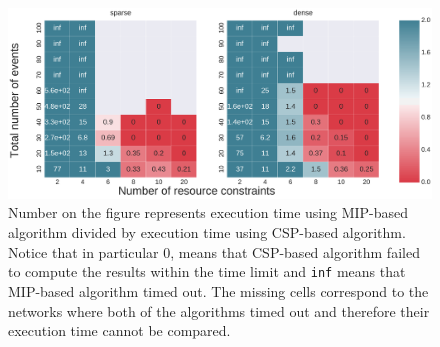 \begin{figure}
\begin{center}
\includegraphics[width=\textwidth]{when_better}
\caption{Number on the figure represents execution time using MIP-based algorithm divided by execution time using CSP-based algorithm. Notice that in particular $0$, means that CSP-based algorithm failed to compute the results within the time limit and \texttt{inf} means that MIP-based algorithm timed out. The missing cells correspond to the networks where both of the algorithms timed out and therefore their execution time cannot be compared.   }
\label{fig:when_better}
\end{center}
\end{figure}

